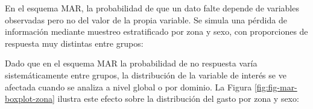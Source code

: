 \documentclass[
  spanish,
  12pt,
]{book}
\newenvironment{Shaded}{\begin{snugshade}}{\end{snugshade}}
\newcommand{\AttributeTok}[1]{\textcolor[rgb]{0.13,0.29,0.53}{#1}}
\newcommand{\DecValTok}[1]{\textcolor[rgb]{0.00,0.00,0.81}{#1}}
\newcommand{\FunctionTok}[1]{\textcolor[rgb]{0.13,0.29,0.53}{\textbf{#1}}}
\newcommand{\NormalTok}[1]{#1}
\newcommand{\OtherTok}[1]{\textcolor[rgb]{0.56,0.35,0.01}{#1}}
\newcommand{\SpecialCharTok}[1]{\textcolor[rgb]{0.81,0.36,0.00}{\textbf{#1}}}
\newcommand{\StringTok}[1]{\textcolor[rgb]{0.31,0.60,0.02}{#1}}
\begin{document}
En el esquema MAR, la probabilidad de que un dato falte depende de variables observadas pero no del valor de la propia variable. Se simula una pérdida de información mediante muestreo estratificado por zona y sexo, con proporciones de respuesta muy distintas entre grupos:

\begin{Shaded}
\end{Shaded}

Dado que en el esquema MAR la probabilidad de no respuesta varía sistemáticamente entre grupos, la distribución de la variable de interés se ve afectada cuando se analiza a nivel global o por dominio. La Figura \ref{fig:fig-mar-boxplot-zona} ilustra este efecto sobre la distribución del gasto por zona y sexo:

\begin{Shaded}
\end{Shaded}
\end{document}
